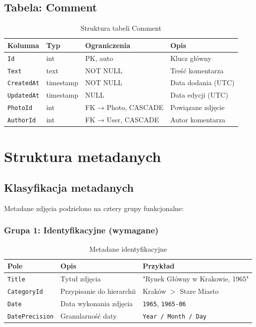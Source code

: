 \documentclass[12pt, a4paper]{article}
\begin{document}
\subsection{Tabela: Comment}

\begin{table}[H]
  \centering
  \caption{Struktura tabeli Comment}
  \begin{tabular}{@{}L{3cm}L{2.5cm}L{3.5cm}L{4.5cm}@{}}
    \toprule
    \textbf{Kolumna} & \textbf{Typ} & \textbf{Ograniczenia} & \textbf{Opis} \\
    \midrule
    \texttt{Id}        & int       & PK, auto          & Klucz główny \\
    \texttt{Text}      & text      & NOT NULL          & Treść komentarza \\
    \texttt{CreatedAt} & timestamp & NOT NULL          & Data dodania (UTC) \\
    \texttt{UpdatedAt} & timestamp & NULL              & Data edycji (UTC) \\
    \texttt{PhotoId}   & int       & FK → Photo, CASCADE & Powiązane zdjęcie \\
    \texttt{AuthorId}  & int       & FK → User, CASCADE  & Autor komentarza \\
    \bottomrule
  \end{tabular}
\end{table}

\section{Struktura metadanych}

\subsection{Klasyfikacja metadanych}

Metadane zdjęcia podzielono na cztery grupy funkcjonalne:

\subsubsection{Grupa 1: Identyfikacyjne (wymagane)}

\begin{table}[H]
  \centering
  \caption{Metadane identyfikacyjne}
  \begin{tabular}{@{}L{3.5cm}L{5.5cm}L{5cm}@{}}
    \toprule
    \textbf{Pole} & \textbf{Opis} & \textbf{Przykład} \\
    \midrule
    \texttt{Title}         & Tytuł zdjęcia              & "Rynek Główny w Krakowie, 1965" \\
    \texttt{CategoryId}    & Przypisanie do hierarchii  & Kraków $>$ Stare Miasto \\
    \texttt{Date}          & Data wykonania zdjęcia     & \texttt{1965}, \texttt{1965-06} \\
    \texttt{DatePrecision} & Granularność daty          & \texttt{Year / Month / Day} \\
    \bottomrule
  \end{tabular}
\end{table}
\end{document}
